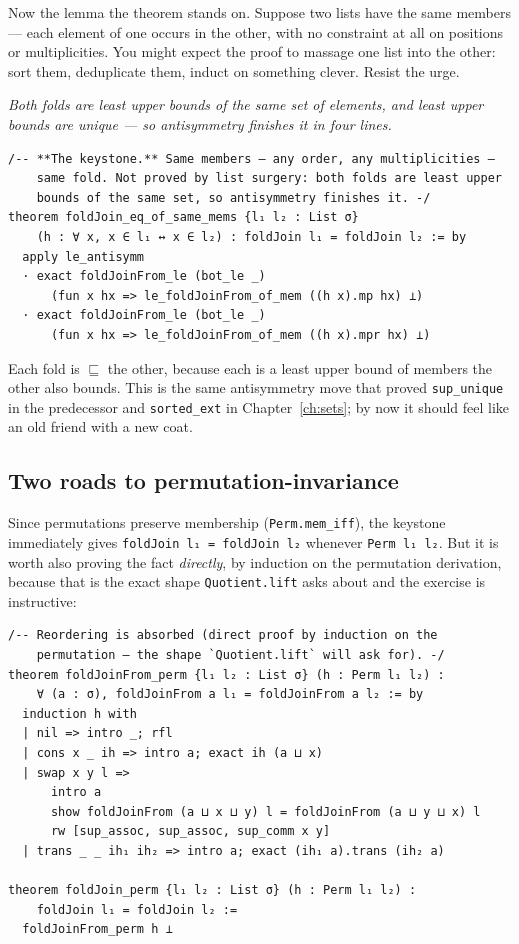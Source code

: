 \documentclass[12pt, a4paper, openright]{book}
\theoremstyle{thmstyle}
\theoremstyle{defstyle}
\newcommand{\lc}[1]{\texttt{#1}}
\newcounter{exercise}[chapter]
\begin{document}
Now the lemma the theorem stands on. Suppose two lists have the same
members --- each element of one occurs in the other, with no constraint at
all on positions or multiplicities. You might expect the proof to
massage one list into the other: sort them, deduplicate them, induct on
something clever. Resist the urge.

\emph{Both folds are least upper bounds of the same set of elements, and
least upper bounds are unique --- so antisymmetry finishes it in four
lines.}

\begin{verbatim}
/-- **The keystone.** Same members — any order, any multiplicities —
    same fold. Not proved by list surgery: both folds are least upper
    bounds of the same set, so antisymmetry finishes it. -/
theorem foldJoin_eq_of_same_mems {l₁ l₂ : List σ}
    (h : ∀ x, x ∈ l₁ ↔ x ∈ l₂) : foldJoin l₁ = foldJoin l₂ := by
  apply le_antisymm
  · exact foldJoinFrom_le (bot_le _)
      (fun x hx => le_foldJoinFrom_of_mem ((h x).mp hx) ⊥)
  · exact foldJoinFrom_le (bot_le _)
      (fun x hx => le_foldJoinFrom_of_mem ((h x).mpr hx) ⊥)
\end{verbatim}

Each fold is $\sqsubseteq$ the other, because each is a least upper bound
of members the other also bounds. This is the same antisymmetry move that
proved \lc{sup_unique} in the predecessor and \lc{sorted_ext} in
Chapter~\ref{ch:sets}; by now it should feel like an old friend with a
new coat.

\subsection{Two roads to permutation-invariance}

Since permutations preserve membership (\lc{Perm.mem_iff}), the keystone
immediately gives \lc{foldJoin l₁ = foldJoin l₂} whenever
\lc{Perm l₁ l₂}. But it is worth also proving the fact \emph{directly},
by induction on the permutation derivation, because that is the exact
shape \lc{Quotient.lift} asks about and the exercise is instructive:

\begin{verbatim}
/-- Reordering is absorbed (direct proof by induction on the
    permutation — the shape `Quotient.lift` will ask for). -/
theorem foldJoinFrom_perm {l₁ l₂ : List σ} (h : Perm l₁ l₂) :
    ∀ (a : σ), foldJoinFrom a l₁ = foldJoinFrom a l₂ := by
  induction h with
  | nil => intro _; rfl
  | cons x _ ih => intro a; exact ih (a ⊔ x)
  | swap x y l =>
      intro a
      show foldJoinFrom (a ⊔ x ⊔ y) l = foldJoinFrom (a ⊔ y ⊔ x) l
      rw [sup_assoc, sup_assoc, sup_comm x y]
  | trans _ _ ih₁ ih₂ => intro a; exact (ih₁ a).trans (ih₂ a)

theorem foldJoin_perm {l₁ l₂ : List σ} (h : Perm l₁ l₂) :
    foldJoin l₁ = foldJoin l₂ :=
  foldJoinFrom_perm h ⊥
\end{verbatim}
\end{document}
